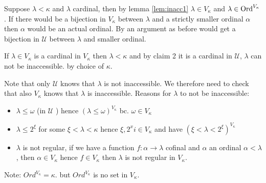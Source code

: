 {\begin{claimproof}
        Suppose $\lambda<\kappa$ and $\lambda$ cardinal, then by lemma \ref{lem:inacc1} $\lambda\in V_\kappa$ and $\lambda\in \operatorname{Ord}^{V_\kappa}$.
        If there would be a bijection in $V_\kappa$ between $\lambda$ and a strictly smaller ordinal 
        $\alpha$ then $\alpha$ would be an actual ordinal. By an argument as before would get a bijection in 
        $\mathcal{U}$ between $\lambda$ and smaller ordinal.
    \end{claimproof}
    If $\lambda\in V_\kappa$ is a cardinal in $V_\kappa$ then $\lambda<\kappa$ and by claim 2 it is a cardinal in $\mathcal{U}$, $\lambda$ can not be inaccessible. by choice of $\kappa$.

    Note that only $\mathcal{U}$ knows that $\lambda$ is not inaccessible. We therefore need to check that also $V_\kappa$ knows that $\lambda$ is inaccessible.
    Reasons for $\lambda$ to not be inaccessible:
    \begin{itemize}
        \item $\lambda\leq \omega$ (in $\mathcal{U}$ ) hence $(\lambda\leq \omega)^{V_\kappa}$ bc. $\omega\in V_\kappa$
        \item $\lambda\leq 2^\xi$ for some $\xi <\lambda<\kappa$ hence
        $\xi,2^xi\in V_\kappa$ and have $(\xi<\lambda<2^\xi)^{V_\kappa}$
        \item $\lambda$ is not regular, if we have a function $f:\alpha\to \lambda$ cofinal and $\alpha$ an ordinal $\alpha<\lambda$, then $\alpha\in V_\kappa$ hence $f\in V_\kappa$ then $\lambda$ is not regular in $V_\kappa$.
    \end{itemize}
}

Note: $Ord^{V_\kappa}=\kappa$. but $Ord^{V_\kappa}$ is no set in $V_\kappa$.
